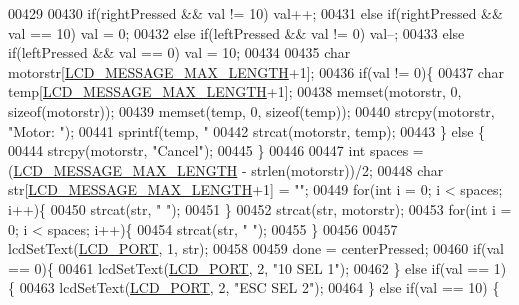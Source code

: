 \begin{DoxyCode}
{{00429 
00430         \textcolor{keywordflow}{if}(rightPressed && val != 10) val++;
00431         \textcolor{keywordflow}{else} \textcolor{keywordflow}{if}(rightPressed && val == 10) val = 0;
00432         \textcolor{keywordflow}{else} \textcolor{keywordflow}{if}(leftPressed && val != 0) val--;
00433         \textcolor{keywordflow}{else} \textcolor{keywordflow}{if}(leftPressed && val == 0) val = 10;
00434 
00435         \textcolor{keywordtype}{char} motorstr[\hyperlink{lcdmsg_8h_abe4c4b70fc6f44ae3680e5b2c68cdd00}{LCD\_MESSAGE\_MAX\_LENGTH}+1];
00436         \textcolor{keywordflow}{if}(val != 0)\{
00437             \textcolor{keywordtype}{char} temp[\hyperlink{lcdmsg_8h_abe4c4b70fc6f44ae3680e5b2c68cdd00}{LCD\_MESSAGE\_MAX\_LENGTH}+1];
00438             memset(motorstr, 0, \textcolor{keyword}{sizeof}(motorstr));
00439             memset(temp, 0, \textcolor{keyword}{sizeof}(temp));
00440             strcpy(motorstr, \textcolor{stringliteral}{"Motor: "});
00441             sprintf(temp, \textcolor{stringliteral}{"%
00442             strcat(motorstr, temp);
00443         \} \textcolor{keywordflow}{else} \{
00444             strcpy(motorstr, \textcolor{stringliteral}{"Cancel"});
00445         \}
00446 
00447         \textcolor{keywordtype}{int} spaces = (\hyperlink{lcdmsg_8h_abe4c4b70fc6f44ae3680e5b2c68cdd00}{LCD\_MESSAGE\_MAX\_LENGTH} - strlen(motorstr))/2;
00448         \textcolor{keywordtype}{char} str[\hyperlink{lcdmsg_8h_abe4c4b70fc6f44ae3680e5b2c68cdd00}{LCD\_MESSAGE\_MAX\_LENGTH}+1] = \textcolor{stringliteral}{""};
00449         \textcolor{keywordflow}{for}(\textcolor{keywordtype}{int} i = 0; i < spaces; i++)\{
00450             strcat(str, \textcolor{stringliteral}{" "});
00451         \}
00452         strcat(str, motorstr);
00453         \textcolor{keywordflow}{for}(\textcolor{keywordtype}{int} i = 0; i < spaces; i++)\{
00454             strcat(str, \textcolor{stringliteral}{" "});
00455         \}
00456 
00457         lcdSetText(\hyperlink{lcdmsg_8h_abcf42bd88b3c36193f301ca25b033875}{LCD\_PORT}, 1, str);
00458 
00459         done = centerPressed;
00460         \textcolor{keywordflow}{if}(val == 0)\{
00461             lcdSetText(\hyperlink{lcdmsg_8h_abcf42bd88b3c36193f301ca25b033875}{LCD\_PORT}, 2, \textcolor{stringliteral}{"10     SEL     1"});
00462         \} \textcolor{keywordflow}{else} \textcolor{keywordflow}{if}(val == 1) \{
00463             lcdSetText(\hyperlink{lcdmsg_8h_abcf42bd88b3c36193f301ca25b033875}{LCD\_PORT}, 2, \textcolor{stringliteral}{"ESC    SEL     2"});
00464         \} \textcolor{keywordflow}{else} \textcolor{keywordflow}{if}(val == 10) \{
}}}
\end{DoxyCode}

